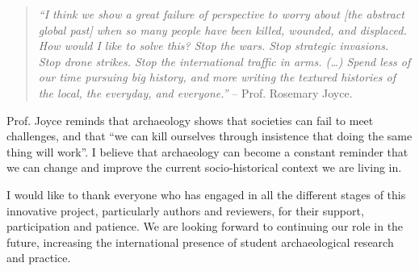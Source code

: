  \blockquote{\textit{“I think we show a great failure of perspective to worry about [the abstract global past] when so many people have been killed, wounded, and displaced. How would I like to solve this? Stop the wars. Stop strategic invasions. Stop drone strikes. Stop the international traffic in arms. (\ldots) Spend less of our time pursuing big history, and more writing the textured histories of the local, the everyday, and everyone.”} – Prof. Rosemary Joyce.}	 
		 Prof. Joyce reminds that archaeology shows that societies can fail to meet challenges, and that “we can kill ourselves through insistence that doing the same thing will work”. I believe that archaeology can become a constant reminder that we can change and improve the current socio-historical context we are living in.

		I would like to thank everyone who has engaged in all the different stages of this innovative project, particularly authors and reviewers, for their support, participation and patience. We are looking forward to continuing our role in the future, increasing the international presence of student archaeological research and practice. 

		

	\label{presentation:lastpage}
\closingarticle
